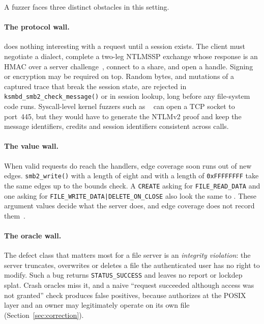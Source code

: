 \documentclass{article}
\begin{document}
A fuzzer faces three distinct obstacles in this setting.

\paragraph{The protocol wall.} \ksmbd does nothing interesting with a request
until a session exists. The client must negotiate a dialect, complete a
two-leg NTLMSSP exchange whose response is an HMAC over a server
challenge~\cite{msnlmp}, connect to a share, and open a handle. Signing or
encryption may be required on top. Random bytes, and mutations of a captured
trace that break the session state, are rejected in
\texttt{ksmbd\_smb2\_check\_message()} or in session lookup, long before any
file-system code runs. Syscall-level kernel fuzzers such as
\syzkaller~\cite{vyukov2015syzkaller} can open a TCP socket to port~445, but
they would have to generate the NTLMv2 proof and keep the message identifiers,
credits and session identifiers consistent across calls.

\paragraph{The value wall.} When valid requests do reach the handlers, edge
coverage soon runs out of new edges. \texttt{smb2\_write()} with a length of
eight and with a length of \texttt{0xFFFFFFFF} take the same edges up to the
bounds check. A \texttt{CREATE} asking for \texttt{FILE\_READ\_DATA} and one
asking for \texttt{FILE\_WRITE\_DATA|DELETE\_ON\_CLOSE} also look the same to
\tracepc. These argument values decide what the server does, and edge coverage
does not record them~\cite{kim2026kcovdataflow}.

\paragraph{The oracle wall.} The defect class that matters most for a file
server is an \emph{integrity violation}: the server truncates, overwrites or
deletes a file the authenticated user has no right to modify. Such a bug
returns \texttt{STATUS\_SUCCESS} and leaves no \kasan report or lockdep splat.
Crash oracles miss it, and a naive ``request succeeded although access was
not granted'' check produces false positives, because \ksmbd authorizes at the
POSIX layer and an owner may legitimately operate on its own file
(Section~\ref{sec:correction}).
\end{document}
